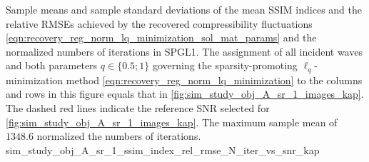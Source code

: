%
{%
 Sample means and
 sample standard deviations of
 the mean \acf{SSIM} indices and
 the relative \acfp{RMSE} achieved by
 the recovered compressibility fluctuations
 \eqref{eqn:recovery_reg_norm_lq_minimization_sol_mat_params} and
 the normalized numbers of
 iterations in
 \ac{SPGL1}.
 The assignment of
 all incident waves and
 both parameters
 $q \in \{ 0.5; 1 \}$ governing
 the sparsity-promoting $\ell_{q}$-minimization method
 \eqref{eqn:recovery_reg_norm_lq_minimization} to
 the columns and rows in
 this figure equals
 that in
 \cref{fig:sim_study_obj_A_sr_1_images_kap}.
 The dashed red lines indicate
 the reference \ac{SNR} selected for
 \cref{fig:sim_study_obj_A_sr_1_images_kap}.
 The maximum sample mean of
 $\num{1348.6}$ normalized
 the numbers of
 iterations.
}%
{sim_study_obj_A_sr_1_ssim_index_rel_rmse_N_iter_vs_snr_kap}

